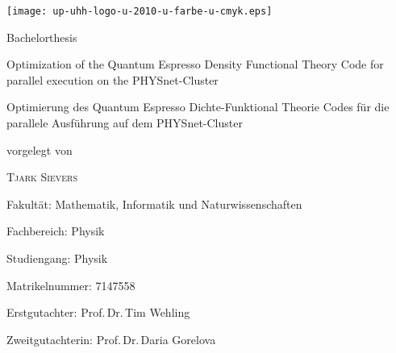 \documentclass[main.tex]{subfiles}
\begin{document}
\begin{titlepage}
    \texttt{[image: up-uhh-logo-u-2010-u-farbe-u-cmyk.eps]}\par
    \vspace{4\baselineskip}

    \begin{center}
        {\Large\textcolor{UHHred}{Bachelorthesis}\par}

        {\Huge Optimization of the Quantum Espresso Density Functional Theory Code for parallel execution on the PHYSnet-Cluster\par}

        \vspace{1\baselineskip}
        
        {\Large Optimierung des Quantum Espresso Dichte-Funktional Theorie Codes für die parallele Ausführung auf dem PHYSnet-Cluster\par}

        \vspace{4\baselineskip}

        vorgelegt von\par

        {\Large\textsc{Tjark Sievers}\par}
    \end{center}

    \vfill

    Fakultät: Mathematik, Informatik und Naturwissenschaften\par
    Fachbereich: Physik\par
    Studiengang: Physik\par
    Matrikelnummer: 7147558\par
 
    Erstgutachter: Prof.\,Dr.\,Tim Wehling \par
    Zweitgutachterin: Prof.\,Dr.\,Daria Gorelova \par
\end{titlepage}
\end{document}
